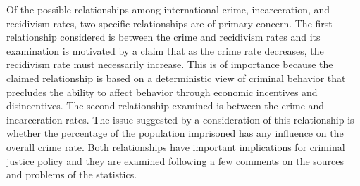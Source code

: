 Of the possible relationships among international crime, incarceration, and recidivism rates, two specific relationships are of primary concern.  The first relationship considered is between the crime and recidivism rates and its examination is motivated by a claim that as the crime rate decreases, the recidivism rate must necessarily increase.  This is of importance because the claimed relationship is based on a deterministic view of criminal behavior that precludes the ability to affect behavior through economic incentives and disincentives.  The second relationship examined is between the crime and incarceration rates.  The issue suggested by a consideration of this relationship is whether the percentage of the population imprisoned has any influence on the overall crime rate.  Both relationships have important implications for criminal justice policy and they are examined following a few comments on the sources and problems of the statistics.

